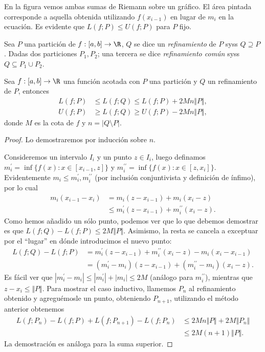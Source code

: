 \documentclass[11pt,oneside,a4paper]{book}
\begin{document}
En la figura vemos ambas sumas de Riemann sobre un gráfico. El área pintada corresponde a aquella obtenida utilizando $f(x_{i-1})$ en lugar de $m_i$ en la ecuación. Es evidente que $L(f;P)\leq U(f;P)$ para $P$ fijo.
\begin{mydef}[Refinamiento]
Sea $P$ una partición de $f:[a,b]\rightarrow\R$, $Q$ se dice un \textit{refinamiento} de $P$ syss $Q\supseteq P$. Dadas dos particiones $P_1,P_2$; una tercera se dice \textit{refinamiento común} syss $Q\subseteq P_1\cup P_2$.
\end{mydef}
\begin{lem}
Sea $f:[a,b]\rightarrow\R$ una función acotada con $P$ una partición y $Q$ un refinamiento de $P$, entonces
\begin{align*}
L(f;P)&\leq L(f;Q)\leq L(f;P)+2Mn\Vert P\Vert,\\
U(f;P)&\geq L(f;Q)\geq U(f;P)-2Mn\Vert P\Vert,
\end{align*}
donde $M$ es la cota de $f$ y $n=|Q\setminus P|$.
\end{lem}
\begin{proof}
Lo demostraremos por inducción sobre $n$.

Consideremos un intervalo $I_i$ y un punto $z\in I_i$, luego definamos $m^{\prime}_i=\inf\{f(x):x\in[x_{i-1},z]\}$ y $m^{\prime\prime}_i=\inf\{f(x):x\in[z,x_i]\}$. Evidentemente $m_i\leq m^{\prime}_i,m^{\prime\prime}_i$ (por inclusión conjuntivista y definición de ínfimo), por lo cual
\begin{align*}
m_i(x_{i-1}-x_i)&=m_i(z-x_{i-1})+m_i(x_i-z)\\
&\leq m^{\prime}_i(z-x_{i-1})+m^{\prime\prime}_i(x_i-z).
\end{align*}
Como hemos añadido un sólo punto, podemos ver que lo que debemos demostrar es que $L(f;Q)-L(f;P)\leq2M\Vert P\Vert$. Asimismo, la resta se cancela a exceptuar por el ``lugar'' en dónde introducimos el nuevo punto:
\begin{align*}
L(f;Q)-L(f;P)&=m^{\prime}_i(z-x_{i-1})+m^{\prime\prime}_i(x_i-z)-m_i(x_i-x_{i-1})\\
&=(m^{\prime}_i-m_i)(z-x_{i-1})+(m^{\prime\prime}_i-m_i)(x_i-z).
\end{align*}
Es fácil ver que $|m^\prime_i-m_i|\leq|m^\prime_i|+|m_i|\leq 2M$ (análogo para $m^{\prime\prime}_i$), mientras que $z-x_i\leq\Vert P\Vert$. Para mostrar el caso inductivo, llamemos $P_n$ al refinamiento obtenido y agreguémosle un punto, obteniendo $P_{n+1}$, utilizando el método anterior obtenemos
\begin{align*}
L(f;P_n)-L(f;P)+L(f;P_{n+1})-L(f;P_n)&\leq 2Mn\Vert P\Vert+2M\Vert P_n\Vert\\
&\leq 2M(n+1)\Vert P\Vert.
\end{align*}
La demostración es análoga para la suma superior.
\end{proof}
\end{document}
